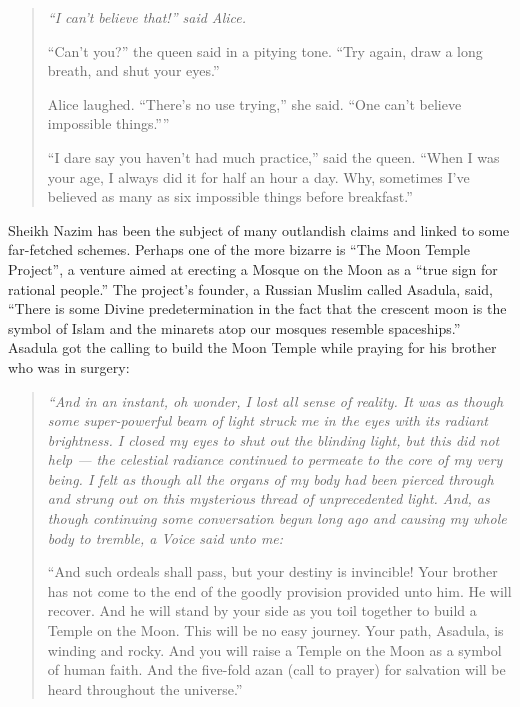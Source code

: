 \documentclass[12pt]{memoir}
\def\–{-\hskip0pt}
\begin{document}
\begin{quote}
\itshape
“I can’t believe that!” said Alice.

“Can’t you?” the queen said in a pitying tone.
“Try again, draw a long breath, and shut your eyes.”

Alice laughed. “There’s no use trying,” she said.
“One can’t believe impossible things.”''

“I dare say you haven’t had much practice,” said the queen.
“When I was your age, I always did it for half an hour a day.
Why, sometimes I’ve believed as many as six impossible things
before breakfast.”
\end{quote}

Sheikh Nazim has been the subject of many outlandish claims
and linked to some far\–fetched schemes.
Perhaps one of the more bizarre is “The Moon Temple Project”,
a venture aimed at erecting a Mosque on the Moon
as a “true sign for rational people.”
The project’s founder, a Russian Muslim called Asadula, said,
“There is some Divine predetermination in the fact
that the crescent moon is the symbol of Islam
and the minarets atop our mosques resemble spaceships.”
Asadula got the calling to build the Moon Temple
while praying for his brother who was in surgery:

\begin{quote}
\itshape
“And in an instant, oh wonder, I lost all sense of reality.
It was as though some super-powerful beam of light struck me in the eyes
with its radiant brightness.
I closed my eyes to shut out the blinding light, but this did not help —
the celestial radiance continued to permeate to the core of my very being.
I felt as though all the organs of my body had been pierced through
and strung out on this mysterious thread of unprecedented light.
And, as though continuing some conversation begun long ago
and causing my whole body to tremble, a Voice said unto me:

“And such ordeals shall pass, but your destiny is invincible!
Your brother has not come to the end
of the goodly provision provided unto him.
He will recover.
And he will stand by your side as you toil together
to build a Temple on the Moon.
This will be no easy journey.
Your path, Asadula, is winding and rocky.
And you will raise a Temple on the Moon as a symbol of human faith.
And the five-fold azan (call to prayer) for salvation
will be heard throughout the universe.”
\end{quote}
\end{document}
